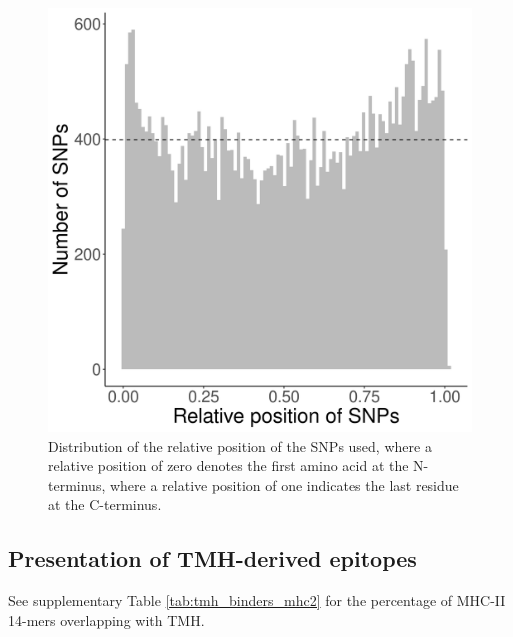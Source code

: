 \begin{figure}[!htbp]
  \includegraphics[width=\textwidth]{ncbi_peregrine_results/fig_snp_rel_pos.png}
  \caption{
    Distribution of the relative position of the SNPs used,
    where a relative position of zero denotes the first amino
    acid at the N-terminus, where a relative position of one
    indicates the last residue at the C-terminus.
  }
  \label{fig:snp_rel_pos}
\end{figure}

\clearpage

\subsection{Presentation of TMH-derived epitopes}

See supplementary Table \ref{tab:tmh_binders_mhc2} 
for the percentage of MHC-II 14-mers overlapping with TMH.



\clearpage

